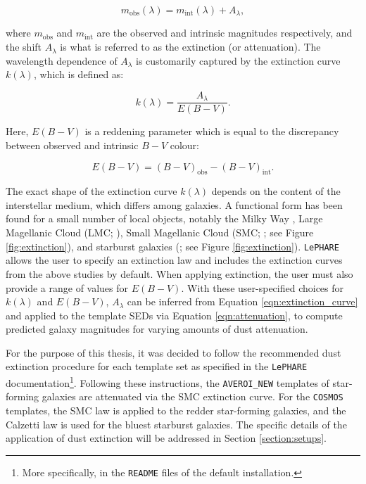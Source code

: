 \begin{equation}
m_{\mathrm{obs}}(\lambda) = m_{\mathrm{int}}(\lambda) + A_{\lambda},\label{eqn:attenuation}
\end{equation}

\noindent where $m_{\mathrm{obs}}$ and $m_{\mathrm{int}}$ are the observed and intrinsic magnitudes respectively, and the shift $A_{\lambda}$ is what is referred to as the extinction (or attenuation). The wavelength dependence of $A_{\lambda}$ is customarily captured by the extinction curve $k(\lambda)$, which is defined as: 


\begin{equation}
k(\lambda) = \frac{A_{\lambda}}{E(B-V)}.\label{eqn:extinction_curve}
\end{equation}

\noindent Here, $E(B-V)$ is a reddening parameter which is equal to the discrepancy between observed and intrinsic $B-V$ colour:
 

\begin{equation}
E(B-V) = (B-V)_{\mathrm{obs}}-(B-V)_{\mathrm{int}}.\label{eqn:eb_v}
\end{equation}

The exact shape of the extinction curve $k(\lambda)$ depends on the content of the interstellar medium, which differs among galaxies.  A functional form has been found for a small number of local objects, notably the Milky Way \citep{1979MNRAS.187P..73S,1976MNRAS.174P..29A}, Large Magellanic Cloud (LMC; \citealt{1986AJ.....92.1068F}), Small Magellanic Cloud (SMC; \citealt{1984A&A...132..389P}; see Figure \ref{fig:extinction}), and starburst galaxies (\citealt{2000ApJ...533..682C}; see Figure \ref{fig:extinction}).  \texttt{LePHARE} allows the user to specify an extinction law and includes the extinction curves from the above studies by default. When applying extinction, the user must also provide a range of values for $E(B-V)$. With these user-specified choices for $k(\lambda)$ and $E(B-V)$, $A_{\lambda}$ can be inferred from Equation \ref{eqn:extinction_curve} and applied to the template SEDs via Equation \ref{eqn:attenuation}, to compute predicted galaxy magnitudes for varying amounts of dust attenuation. \par


For the purpose of this thesis, it was decided to follow the recommended dust extinction procedure for each template set as specified in the \texttt{LePHARE} documentation\footnote{More specifically, in the \texttt{README} files of the default installation.}. Following these instructions, the \texttt{AVEROI\_NEW} templates of star-forming galaxies are attenuated via the  SMC extinction curve. For the \texttt{COSMOS} templates, the SMC law is applied to the redder star-forming galaxies, and the Calzetti law is used for the bluest starburst galaxies. The specific details of the application of dust extinction will be addressed in Section \ref{section:setups}. \par



